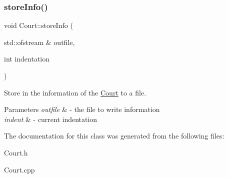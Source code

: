 \subsubsection{\texorpdfstring{store\+Info()}{storeInfo()}}
{\footnotesize\ttfamily void Court\+::store\+Info (\begin{DoxyParamCaption}\item[{std\+::ofstream \&}]{outfile,  }\item[{int}]{indentation }\end{DoxyParamCaption})}



Store in the information of the \mbox{\hyperlink{class_court}{Court}} to a file. 


\begin{DoxyParams}{Parameters}
{\em outfile} & -\/ the file to write information \\
\hline
{\em indent} & -\/ current indentation \\
\hline
\end{DoxyParams}


The documentation for this class was generated from the following files\+:\begin{DoxyCompactItemize}
\item 
Court.\+h\item 
Court.\+cpp\end{DoxyCompactItemize}
